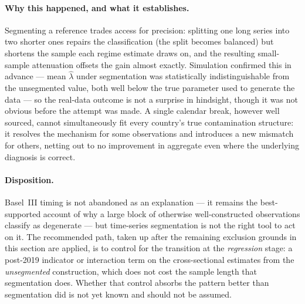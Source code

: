 \documentclass[11pt]{article}
\begin{document}
\paragraph{Why this happened, and what it establishes.} Segmenting a
reference trades access for precision: splitting one long series into two
shorter ones repairs the classification (the split becomes balanced) but
shortens the sample each regime estimate draws on, and the resulting
small-sample attenuation offsets the gain almost exactly. Simulation
confirmed this in advance --- mean $\hat\lambda$ under segmentation was
statistically indistinguishable from the unsegmented value, both well below
the true parameter used to generate the data --- so the real-data outcome
is not a surprise in hindsight, though it was not obvious before the
attempt was made. A single calendar break, however well sourced, cannot
simultaneously fit every country's true contamination structure: it
resolves the mechanism for some observations and introduces a new mismatch
for others, netting out to no improvement in aggregate even where the
underlying diagnosis is correct.

\paragraph{Disposition.} Basel~III timing is not abandoned as an
explanation --- it remains the best-supported account of why a large block
of otherwise well-constructed observations classify as degenerate --- but
time-series segmentation is not the right tool to act on it. The
recommended path, taken up after the remaining exclusion grounds in this
section are applied, is to control for the transition at the
\emph{regression} stage: a post-2019 indicator or interaction term on the
cross-sectional estimates from the \emph{unsegmented} construction, which
does not cost the sample length that segmentation does. Whether that
control absorbs the pattern better than segmentation did is not yet known
and should not be assumed.
\end{document}
